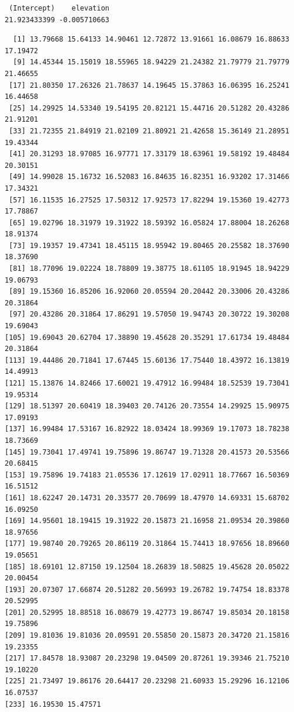 \documentclass[
  letterpaper,
  DIV=11,
  numbers=noendperiod]{scrreprt}
\newenvironment{Shaded}{\begin{snugshade}}{\end{snugshade}}
\newcommand{\FloatTok}[1]{\textcolor[rgb]{0.68,0.00,0.00}{#1}}
\newcommand{\NormalTok}[1]{\textcolor[rgb]{0.00,0.23,0.31}{#1}}
\newcommand{\OtherTok}[1]{\textcolor[rgb]{0.00,0.23,0.31}{#1}}
\newcommand{\SpecialCharTok}[1]{\textcolor[rgb]{0.37,0.37,0.37}{#1}}
\begin{document}
\begin{verbatim}
 (Intercept)    elevation 
21.923433399 -0.005710663 
\end{verbatim}

\begin{Shaded}
\end{Shaded}

\begin{verbatim}
  [1] 13.79668 15.64133 14.90461 12.72872 13.91661 16.08679 16.88633 17.19472
  [9] 14.45344 15.15019 18.55965 18.94229 21.24382 21.79779 21.79779 21.46655
 [17] 21.80350 17.26326 21.78637 14.19645 15.37863 16.06395 16.25241 16.44658
 [25] 14.29925 14.53340 19.54195 20.82121 15.44716 20.51282 20.43286 21.91201
 [33] 21.72355 21.84919 21.02109 21.80921 21.42658 15.36149 21.28951 19.43344
 [41] 20.31293 18.97085 16.97771 17.33179 18.63961 19.58192 19.48484 20.30151
 [49] 14.99028 15.16732 16.52083 16.84635 16.82351 16.93202 17.31466 17.34321
 [57] 16.11535 16.27525 17.50312 17.92573 17.82294 19.15360 19.42773 17.78867
 [65] 19.02796 18.31979 19.31922 18.59392 16.05824 17.88004 18.26268 18.91374
 [73] 19.19357 19.47341 18.45115 18.95942 19.80465 20.25582 18.37690 18.37690
 [81] 18.77096 19.02224 18.78809 19.38775 18.61105 18.91945 18.94229 19.06793
 [89] 19.15360 16.85206 16.92060 20.05594 20.20442 20.33006 20.43286 20.31864
 [97] 20.43286 20.31864 17.86291 19.57050 19.94743 20.30722 19.30208 19.69043
[105] 19.69043 20.62704 17.38890 19.45628 20.35291 17.61734 19.48484 20.31864
[113] 19.44486 20.71841 17.67445 15.60136 17.75440 18.43972 16.13819 14.49913
[121] 15.13876 14.82466 17.60021 19.47912 16.99484 18.52539 19.73041 19.95314
[129] 18.51397 20.60419 18.39403 20.74126 20.73554 14.29925 15.90975 17.09193
[137] 16.99484 17.53167 16.82922 18.03424 18.99369 19.17073 18.78238 18.73669
[145] 19.73041 17.49741 19.75896 19.86747 19.71328 20.41573 20.53566 20.68415
[153] 19.75896 19.74183 21.05536 17.12619 17.02911 18.77667 16.50369 16.51512
[161] 18.62247 20.14731 20.33577 20.70699 18.47970 14.69331 15.68702 16.09250
[169] 14.95601 18.19415 19.31922 20.15873 21.16958 21.09534 20.39860 18.97656
[177] 19.98740 20.79265 20.86119 20.31864 15.74413 18.97656 18.89660 19.05651
[185] 18.69101 12.87150 19.12504 18.26839 18.50825 19.45628 20.05022 20.00454
[193] 20.07307 17.66874 20.51282 20.56993 19.26782 19.74754 18.83378 20.52995
[201] 20.52995 18.88518 16.08679 19.42773 19.86747 19.85034 20.18158 19.75896
[209] 19.81036 19.81036 20.09591 20.55850 20.15873 20.34720 21.15816 19.23355
[217] 17.84578 18.93087 20.23298 19.04509 20.87261 19.39346 21.75210 19.10220
[225] 21.73497 19.86176 20.64417 20.23298 21.60933 15.29296 16.12106 16.07537
[233] 16.19530 15.47571
\end{verbatim}
\end{document}
